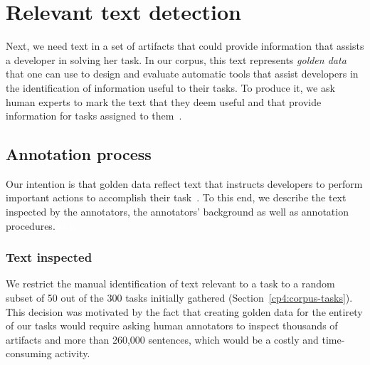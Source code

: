 


\section{Relevant text detection}
\label{cp4:corpus-relevant-text}




Next, we need text in a set of artifacts that could provide information that assists a developer in solving her task.
In our corpus, this text represents \textit{golden data} that one can use to design and evaluate automatic tools that assist developers in the identification of information useful to their tasks. 
To produce it, we 
ask human experts to
mark the text that they deem useful and that provide information for tasks assigned to them~\cite{nadi2020, Robillard2015, marques2020}.



\subsection{Annotation process}


Our intention is that golden data reflect text that instructs developers to perform important actions to accomplish their task~\cite{Robillard2015, Lotufo2012}.
To this end, we describe the text inspected by the annotators, the annotators' background as well as annotation procedures.
\textcolor{white}{\acs{stdv}} %



\subsubsection{Text inspected}




We restrict the manual identification of text relevant to a task to a random subset of 
50  out of the 300  tasks initially gathered (Section~\ref{cp4:corpus-tasks}).
This decision was motivated by the fact that 
creating golden data for the entirety of our tasks 
would require asking human annotators to inspect thousands of artifacts and more than 260,000 sentences, which would be a costly and time-consuming activity. 





